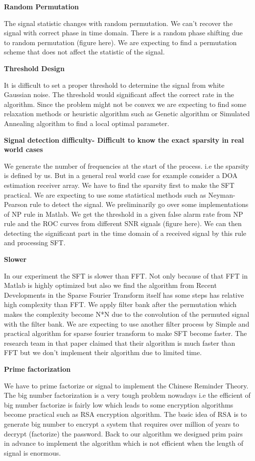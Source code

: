 \documentclass[journal,transmag]{IEEEtran}
\begin{document}
\noindent \textbf{Random Permutation}

The signal statistic changes with random permutation. We can’t recover the signal with correct phase in time domain. There is a random phase shifting due to random permutation (figure here). We are expecting to find a permutation scheme that does not affect the statistic of the signal.

\noindent \textbf{Threshold Design}

It is difficult to set a proper threshold to determine the signal from white Gaussian noise. The threshold would significant affect the correct rate in the algorithm. Since the problem might not be convex we are expecting to find some relaxation methods or heuristic algorithm such as Genetic algorithm or Simulated Annealing algorithm to find a local optimal parameter. 

\noindent \textbf{Signal detection difficulty- Difficult to know the exact sparsity in real world cases}

We generate the number of frequencies at the start of the process. i.e the sparsity is defined by us. But in a general real world case for example consider a DOA estimation receiver array. We have to find the sparsity first to make the SFT practical. 
We are expecting to use some statistical methods such as Neyman-Pearson rule to detect the signal. We preliminarily go over some implementations of NP rule in Matlab. We get the threshold in a given false alarm rate from NP rule and the ROC curves from different SNR signals (figure here). We can then detecting the significant part in the time domain of a received signal by this rule and processing SFT. 

\noindent \textbf{Slower}

In our experiment the SFT is slower than FFT. Not only because of that FFT in Matlab is highly optimized but also we find the algorithm from Recent Developments in the Sparse Fourier Transform itself has some steps has relative high complexity than FFT. We apply filter bank after the permutation which makes the complexity become N*N due to the convolution of the permuted signal with the filter bank. We are expecting to use another filter process by Simple and practical algorithm for sparse fourier transform to make SFT become faster. The research team in that paper claimed that their algorithm is much faster than FFT but we don’t implement their algorithm due to limited time.

\noindent \textbf{Prime factorization} 

We have to prime factorize or signal to implement the Chinese Reminder Theory. The big number factorization is a very tough problem nowadays i.e the efficient of big number factorize is fairly low which leads to some encryption algorithms become practical such as RSA encryption algorithm. The basic idea of RSA is to generate big number to encrypt a system that requires over million of years to decrypt (factorize) the password. Back to our algorithm we designed prim pairs in advance to implement the algorithm which is not efficient when the length of signal is enormous. 





\end{document}
